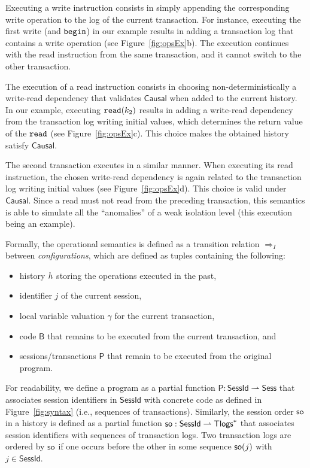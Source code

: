 Executing a write instruction consists in simply appending the corresponding write operation to the log of the current transaction. For instance, executing the first write (and $\mathtt{begin}$) in our example results in adding a transaction log that contains a write operation (see Figure~\ref{fig:opsEx}b). The execution continues with the read instruction from the same transaction, and it cannot switch to the other transaction.

The execution of a read instruction consists in choosing non-deterministically a write-read dependency that validates $\mathsf{Causal}$ when added to the current history. In our example, executing $\mathtt{read}(k_2)$ results in adding a write-read dependency from the transaction log writing initial values, which determines the return value of the $\mathtt{read}$ (see Figure~\ref{fig:opsEx}c). This choice makes the obtained history satisfy $\mathsf{Causal}$. 

The second transaction executes in a similar manner. When executing its read instruction, the chosen write-read dependency is again related to the transaction log writing initial values (see Figure~\ref{fig:opsEx}d). This choice is valid under $\mathsf{Causal}$. Since a read must not read from the preceding transaction, this semantics is able to simulate all the ``anomalies'' of a weak isolation level (this execution being an example).

Formally, the operational semantics is defined as a transition relation $\Rightarrow_I$ between \emph{configurations}, which are defined as tuples containing the following:
\begin{itemize}
	\item history ${h}$ storing the operations executed in the past, 
	\item identifier $j$ of the current session,
	\item local variable valuation $\gamma$ for the current transaction, 
	\item code $\mathsf{B}$ that remains to be executed from the current transaction, and
	\item sessions/transactions $\mathsf{P}$ that remain to be executed from the original program.
\end{itemize}

For readability, we define a program as a partial function $\mathsf{P}:\mathsf{SessId}\rightharpoonup \mathsf{Sess}$ that associates session identifiers in $\mathsf{SessId}$ with concrete code as defined in Figure~\ref{fig:syntax} (i.e., sequences of transactions). Similarly, the session order $\mathsf{so}$ in a history is defined as a partial function $\mathsf{so}:\mathsf{SessId}\rightharpoonup \mathsf{Tlogs}^*$ that associates session identifiers with sequences of transaction logs. Two transaction logs are ordered by $\mathsf{so}$ if one occurs before the other in some sequence $\mathsf{so}(j)$ with 
$j\in \mathsf{SessId}$.

